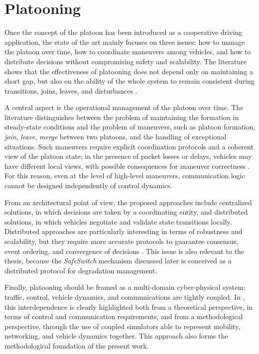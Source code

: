 \section{Platooning}
\label{sec:sota_platooning}

Once the concept of the platoon has been introduced as a cooperative driving application, the state of the art mainly focuses on three issues: how to manage the platoon over time, how to coordinate maneuvers among vehicles, and how to distribute decisions without compromising safety and scalability. The literature shows that the effectiveness of platooning does not depend only on maintaining a short gap, but also on the ability of the whole system to remain consistent during transitions, joins, leaves, and disturbances \cite{segata2014supporting,santini2019platooning,dressler2019cooperative}.

A central aspect is the operational management of the platoon over time. The literature distinguishes between the problem of maintaining the formation in steady-state conditions and the problem of maneuvers, such as platoon formation, \emph{join}, \emph{leave}, \emph{merge} between two platoons, and the handling of exceptional situations. Such maneuvers require explicit coordination protocols and a coherent view of the platoon state; in the presence of packet losses or delays, vehicles may have different local views, with possible consequences for maneuver correctness \cite{segata2014supporting,santini2019platooning}. For this reason, even at the level of high-level maneuvers, communication logic cannot be designed independently of control dynamics.

From an architectural point of view, the proposed approaches include centralized solutions, in which decisions are taken by a coordinating entity, and distributed solutions, in which vehicles negotiate and validate state transitions locally. Distributed approaches are particularly interesting in terms of robustness and scalability, but they require more accurate protocols to guarantee consensus, event ordering, and convergence of decisions \cite{santini2017consensusbased,santini2019platooning}. This issue is also relevant to the thesis, because the \emph{SafeSwitch} mechanism discussed later is conceived as a distributed protocol for degradation management.

Finally, platooning should be framed as a multi-domain cyber-physical system: traffic, control, vehicle dynamics, and communications are tightly coupled. In \cite{segata2016safe}, this interdependence is clearly highlighted both from a theoretical perspective, in terms of control and communication requirements, and from a methodological perspective, through the use of coupled simulators able to represent mobility, networking, and vehicle dynamics together. This approach also forms the methodological foundation of the present work.
